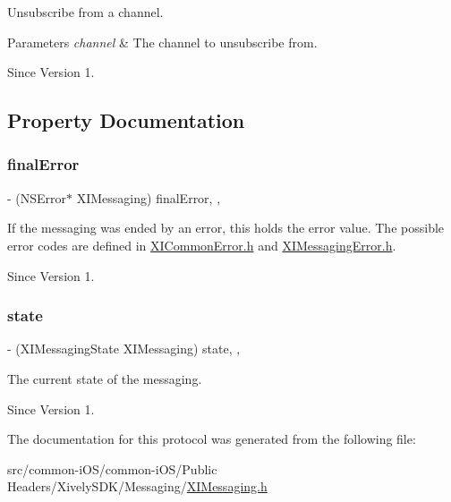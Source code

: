Unsubscribe from a channel. 


\begin{DoxyParams}{Parameters}
{\em channel} & The channel to unsubscribe from. \\
\hline
\end{DoxyParams}
\begin{DoxySince}{Since}
Version 1. 
\end{DoxySince}


\subsection{Property Documentation}
\hypertarget{protocol_x_i_messaging_01-p_a9c7cc05afa1414b88fa8892761818a07}{}\label{protocol_x_i_messaging_01-p_a9c7cc05afa1414b88fa8892761818a07} 
\subsubsection{\texorpdfstring{final\+Error}{finalError}}
{\footnotesize\ttfamily -\/ (N\+S\+Error$\ast$ X\+I\+Messaging) final\+Error\hspace{0.3cm}{\ttfamily [read]}, {\ttfamily [nonatomic]}, {\ttfamily [assign]}}



If the messaging was ended by an error, this holds the error value. The possible error codes are defined in \hyperlink{_x_i_common_error_8h}{X\+I\+Common\+Error.\+h} and \hyperlink{_x_i_messaging_error_8h}{X\+I\+Messaging\+Error.\+h}. 

\begin{DoxySince}{Since}
Version 1. 
\end{DoxySince}
\hypertarget{protocol_x_i_messaging_01-p_aac43b2f050d63a882e6c372886078fe1}{}\label{protocol_x_i_messaging_01-p_aac43b2f050d63a882e6c372886078fe1} 
\subsubsection{\texorpdfstring{state}{state}}
{\footnotesize\ttfamily -\/ (X\+I\+Messaging\+State X\+I\+Messaging) state\hspace{0.3cm}{\ttfamily [read]}, {\ttfamily [nonatomic]}, {\ttfamily [assign]}}



The current state of the messaging. 

\begin{DoxySince}{Since}
Version 1. 
\end{DoxySince}


The documentation for this protocol was generated from the following file\+:\begin{DoxyCompactItemize}
\item 
src/common-\/i\+O\+S/common-\/i\+O\+S/\+Public Headers/\+Xively\+S\+D\+K/\+Messaging/\hyperlink{_x_i_messaging_8h}{X\+I\+Messaging.\+h}\end{DoxyCompactItemize}
